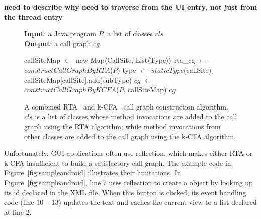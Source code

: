 \textbf{need to describe why need to traverse from the UI entry, not just from the thread entry}


\begin{figure}[t]
\textbf{Input}: a Java program $P$, a list of classes $cls$\\
\textbf{Output}: a call graph $cg$\\
\vspace{-5mm}
\begin{algorithmic}[1]
\STATE callSiteMap $\leftarrow$ new Map$\langle$CallSite, List$\langle$Type$\rangle$$\rangle$
\STATE rta\_cg $\leftarrow$ $constructCallGraphByRTA$($P$)
\STATE type $\leftarrow$ $staticType$(callSite)
\STATE callSiteMap[callSite].add(subType)
\ENDIF
\ENDFOR
\ENDIF
\ENDFOR
\ENDFOR
\STATE $cg$ $\leftarrow$ $constructCallGraphByKCFA$($P$, callSiteMap)
\RETURN $cg$
\vspace{-2mm}
\end{algorithmic}
\label{fig:cgalgorithm}
\caption{A combined  RTA~\cite{rta} and k-CFA~\cite{kcfa} call graph construction algorithm.
$cls$ is a list of classes whose method invocations are added to the
call graph using the RTA algorithm; while method invocations from other classes
are added to the call graph using the k-CFA algorithm.
} 
\end{figure}


Unfortunately, GUI applications often use reflection, which makes either
RTA or k-CFA insufficient to build a satisfactory call graph. 
The example code in Figure~\ref{fig:sampleandroid}  illustrates their limitations.
In Figure~\ref{fig:sampleandroid}, line 7 uses reflection to create a 
object by looking up its id declared in the XML file. When this button
is clicked, its event handling code (line 10 -- 13) updates the text and caches
the current view to a list declared at line 2.

